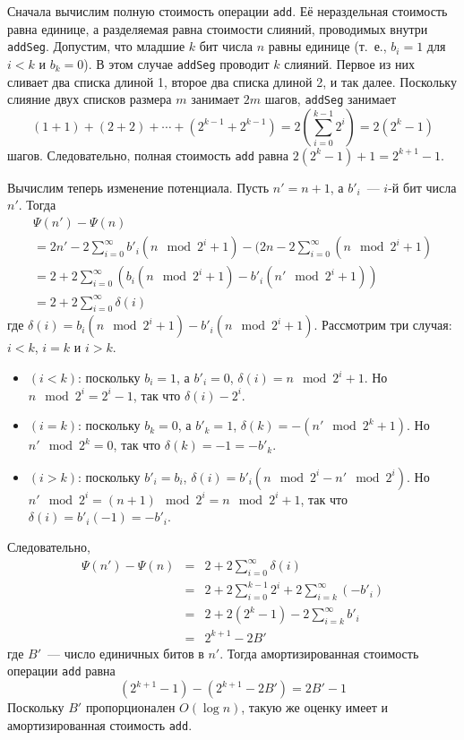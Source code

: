 Сначала вычислим полную стоимость операции \lstinline!add!. Её
нераздельная стоимость равна единице, а разделяемая равна
стоимости слияний, проводимых внутри \lstinline!addSeg!. Допустим, что
младшие $k$ бит числа $n$ равны единице (т.~е., $b_i =1$ для $i < k$ и
$b_k = 0$). В этом случае \lstinline!addSeg! проводит $k$ слияний.
Первое из них сливает два списка длиной 1, второе два списка длиной 2,
и так далее. Поскольку слияние двух списков размера $m$ занимает $2m$
шагов, \lstinline!addSeg! занимает
$$
(1+1) + (2+2) + \cdots + (2^{k-1} + 2^{k-1}) = 2(\sum_{i=0}^{k-1} 2^i)
= 2 (2^k - 1)
$$
шагов. Следовательно, полная стоимость \lstinline!add! равна $2(2^k -
1) + 1 = 2^{k+1} - 1$.

Вычислим теперь изменение потенциала. Пусть $n' = n+1$, а $b'_i$~---
$i$-й бит числа $n'$. Тогда
$$
\begin{array}{l}
\Psi(n') - \Psi(n) \\
= 2n' - 2\sum_{i=0}^\infty b'_i (n \mod 2^i + 1) - (2n - 2\sum_{i=0}^\infty (n \mod 2^i + 1) \\
= 2 + 2\sum_{i=0}^\infty (b_i(n \mod 2^i + 1) - b'_i(n' \mod 2^i + 1)) \\
= 2 + 2\sum_{i=0}^\infty \delta(i)
\end{array}
$$
где $\delta(i) = b_i(n \mod 2^i + 1) - b'_i(n \mod 2^i +
1)$. Рассмотрим три случая: $i < k$, $i = k$ и $i > k$.
\begin{itemize}
\item $(i < k)$: поскольку $b_i = 1$, а $b'_i = 0$, $\delta(i) = n
  \mod 2^i + 1$. Но $n \mod 2^i = 2^i - 1$, так что $\delta(i) - 2^i$.
\item $(i = k)$: поскольку $b_k = 0$, а $b'_k = 1$, $\delta(k) = -(n'
  \mod 2^k + 1)$. Но $n' \mod 2^k = 0$, так что $\delta(k) = -1 = -b'_k$.
\item $(i > k)$: поскольку $b'_i = b_i$, $\delta(i) = b'_i (n \mod 2^i
  - n' \mod 2^i)$. Но $n' \mod 2^i = (n+1) \mod 2^i = n \mod 2^i + 1$,
  так что $\delta(i) = b'_i(-1) = -b'_i$.
\end{itemize}
Следовательно,
$$
\begin{array}{lcl}
\Psi(n') - \Psi(n) & = & 2 + 2\sum_{i=0}^\infty \delta(i) \\
& = & 2 + 2\sum_{i=0}^{k-1} 2^i + 2 \sum_{i=k}^\infty (-b'_i) \\
& = & 2 + 2(2^k - 1) - 2\sum_{i=k}^\infty b'_i \\
& = & 2^{k+1} - 2B'
\end{array}
$$
где $B'$~--- число единичных битов в $n'$. Тогда амортизированная
стоимость операции \lstinline!add! равна
$$
(2^{k+1} - 1) - (2^{k+1} - 2B') = 2B' -1
$$
Поскольку $B'$ пропорционален $O(\log n)$, такую же оценку имеет и
амортизированная стоимость \lstinline!add!.

